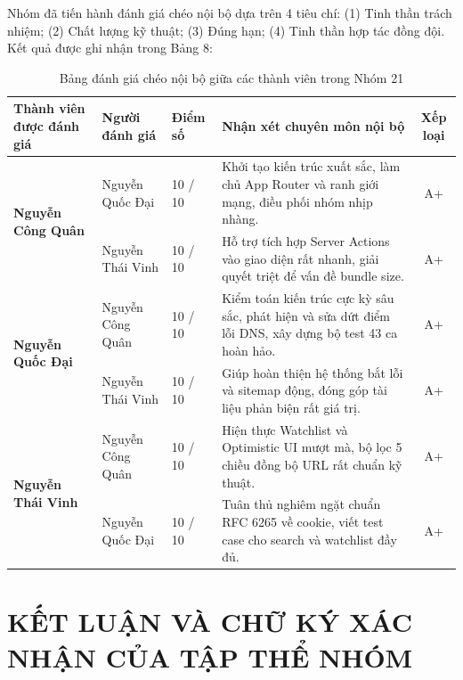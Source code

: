 \documentclass[12pt,a4paper]{extarticle}
\begin{document}
Nhóm đã tiến hành đánh giá chéo nội bộ dựa trên 4 tiêu chí: (1) Tinh thần trách nhiệm; (2) Chất lượng kỹ thuật; (3) Đúng hạn; (4) Tinh thần hợp tác đồng đội. Kết quả được ghi nhận trong Bảng 8:

\begin{table}[H]
\centering
\fontsize{8.5}{10.8}\selectfont
\renewcommand{\arraystretch}{1.12}
\caption{Bảng đánh giá chéo nội bộ giữa các thành viên trong Nhóm 21}
\label{tab:peer_review}
\begin{tabularx}{\textwidth}{|p{3.0cm}|p{2.2cm}|p{2.2cm}|X|c|}
\hline
\rowcolor{tableheader}
\textbf{Thành viên được đánh giá} & \textbf{Người đánh giá} & \textbf{Điểm số} & \textbf{Nhận xét chuyên môn nội bộ} & \textbf{Xếp loại} \\
\hline
\multirow{2}{*}{\textbf{Nguyễn Công Quân}} & Nguyễn Quốc Đại & 10 / 10 & Khởi tạo kiến trúc xuất sắc, làm chủ App Router và ranh giới mạng, điều phối nhóm nhịp nhàng. & A+ \\
\cline{2-5}
& Nguyễn Thái Vinh & 10 / 10 & Hỗ trợ tích hợp Server Actions vào giao diện rất nhanh, giải quyết triệt để vấn đề bundle size. & A+ \\
\hline
\multirow{2}{*}{\textbf{Nguyễn Quốc Đại}} & Nguyễn Công Quân & 10 / 10 & Kiểm toán kiến trúc cực kỳ sâu sắc, phát hiện và sửa dứt điểm lỗi DNS, xây dựng bộ test 43 ca hoàn hảo. & A+ \\
\cline{2-5}
& Nguyễn Thái Vinh & 10 / 10 & Giúp hoàn thiện hệ thống bắt lỗi và sitemap động, đóng góp tài liệu phản biện rất giá trị. & A+ \\
\hline
\multirow{2}{*}{\textbf{Nguyễn Thái Vinh}} & Nguyễn Công Quân & 10 / 10 & Hiện thực Watchlist và Optimistic UI mượt mà, bộ lọc 5 chiều đồng bộ URL rất chuẩn kỹ thuật. & A+ \\
\cline{2-5}
& Nguyễn Quốc Đại & 10 / 10 & Tuân thủ nghiêm ngặt chuẩn RFC 6265 về cookie, viết test case cho search và watchlist đầy đủ. & A+ \\
\hline
\end{tabularx}
\end{table}

\newpage
\section{KẾT LUẬN VÀ CHỮ KÝ XÁC NHẬN CỦA TẬP THỂ NHÓM}
\end{document}
